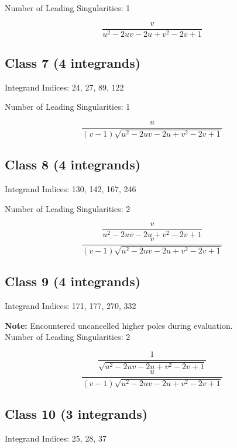 \documentclass[11pt,a4paper]{article}
\begin{document}
Number of Leading Singularities: 1

\begin{equation}
\frac{v}{u^2-2 u v-2 u+v^2-2 v+1}
\end{equation}


\subsection*{Class 7 (4 integrands)}
Integrand Indices: 24, 27, 89, 122

Number of Leading Singularities: 1

\begin{equation}
\frac{u}{(v-1) \sqrt{u^2-2 u v-2 u+v^2-2 v+1}}
\end{equation}


\subsection*{Class 8 (4 integrands)}
Integrand Indices: 130, 142, 167, 246

Number of Leading Singularities: 2

\begin{equation}
\frac{v}{u^2-2 u v-2 u+v^2-2 v+1}
\end{equation}
\begin{equation}
\frac{v}{(v-1) \sqrt{u^2-2 u v-2 u+v^2-2 v+1}}
\end{equation}


\subsection*{Class 9 (4 integrands)}
Integrand Indices: 171, 177, 270, 332

\textbf{Note:} Encountered uncancelled higher poles during evaluation.\\[1em]

Number of Leading Singularities: 2

\begin{equation}
\frac{1}{\sqrt{u^2-2 u v-2 u+v^2-2 v+1}}
\end{equation}
\begin{equation}
\frac{u}{(v-1) \sqrt{u^2-2 u v-2 u+v^2-2 v+1}}
\end{equation}


\subsection*{Class 10 (3 integrands)}
Integrand Indices: 25, 28, 37
\end{document}
